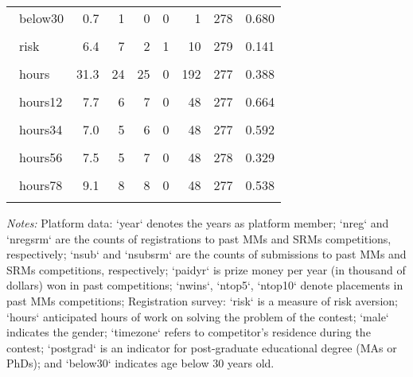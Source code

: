 \documentclass[11pt, titlepage]{article}
\begin{document}
\begin{table}
\begin{tabular}{@{}lrrrrrrr}
   \\[-1.86ex]~below30 & 0.7 & 1 & 0 & 0 & 1 & 278 & 0.680 \\ 
   \\[-1.86ex]~risk & 6.4 & 7 & 2 & 1 & 10 & 279 & 0.141 \\ 
   \\[-1.86ex]~hours & 31.3 & 24 & 25 & 0 & 192 & 277 & 0.388 \\ 
   \\[-1.86ex]~hours12 & 7.7 & 6 & 7 & 0 & 48 & 277 & 0.664 \\ 
   \\[-1.86ex]~hours34 & 7.0 & 5 & 6 & 0 & 48 & 277 & 0.592 \\ 
   \\[-1.86ex]~hours56 & 7.5 & 5 & 7 & 0 & 48 & 278 & 0.329 \\ 
   \\[-1.86ex]~hours78 & 9.1 & 8 & 8 & 0 & 48 & 277 & 0.538 \\ 
   \hline\\[-1.8ex]
\end{tabular}
\begin{minipage}{\textwidth}
\footnotesize\emph{Notes:}{ Platform data: `year` denotes the years as platform member; `nreg` and `nregsrm` are the counts of registrations to past MMs and SRMs competitions, respectively; `nsub` and `nsubsrm` are the counts of submissions to past MMs and SRMs competitions, respectively; `paidyr` is prize money per year (in thousand of dollars) won in past competitions; `nwins`, `ntop5`, `ntop10` denote placements in past MMs competitions; Registration survey: `risk` is a measure of risk aversion; `hours` anticipated hours of work on solving the problem of the contest; `male` indicates the gender; `timezone` refers to competitor's residence during the contest; `postgrad` is an indicator for post-graduate educational degree (MAs or PhDs); and `below30` indicates age below 30 years old.
}\end{minipage}
\end{table}
\end{document}
